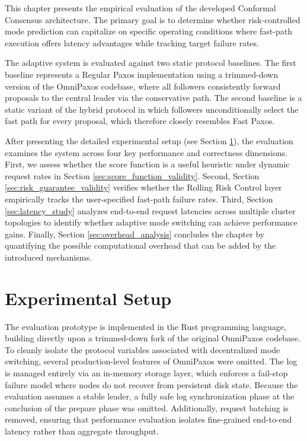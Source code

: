 This chapter presents the empirical evaluation of the developed Conformal Consensus architecture. The primary goal is to determine whether risk-controlled mode prediction can capitalize on specific operating conditions where fast-path execution offers latency advantages while tracking target failure rates.

The adaptive system is evaluated against two static protocol baselines. The first baseline represents a Regular Paxos implementation using a trimmed-down version of the OmniPaxos \cite{Ng-OmniPaxos-2023} codebase, where all followers consistently forward proposals to the central leader via the conservative path. The second baseline is a static variant of the hybrid protocol in which followers unconditionally select the fast path for every proposal, which therefore closely resembles Fast Paxos.

After presenting the detailed experimental setup (see Section \ref{sec:experimental_setup}), the evaluation examines the system across four key performance and correctness dimensions. First, we assess whether the score function is a useful heuristic under dynamic request rates in Section \ref{sec:score_function_validity}. Second, Section \ref{sec:risk_guarantee_validity} verifies whether the Rolling Risk Control layer empirically tracks the user-specified fast-path failure rates. Third, Section \ref{sec:latency_study} analyzes end-to-end request latencies across multiple cluster topologies to identify whether adaptive mode switching can achieve performance gains. Finally, Section \ref{sec:overhead_analysis} concludes the chapter by quantifying the possible computational overhead that can be added by the introduced mechanisms.


\section{Experimental Setup}
\label{sec:experimental_setup}
The evaluation prototype is implemented in the Rust programming language, building directly upon a trimmed-down fork of the original OmniPaxos \cite{Ng-OmniPaxos-2023} codebase. To cleanly isolate the protocol variables associated with decentralized mode switching, several production-level features of OmniPaxos were omitted. The log is managed entirely via an in-memory storage layer, which enforces a fail-stop failure model where nodes do not recover from persistent disk state. Because the evaluation assumes a stable leader, a fully safe log synchronization phase at the conclusion of the prepare phase was omitted. Additionally, request batching is removed, ensuring that performance evaluation isolates fine-grained end-to-end latency rather than aggregate throughput.

